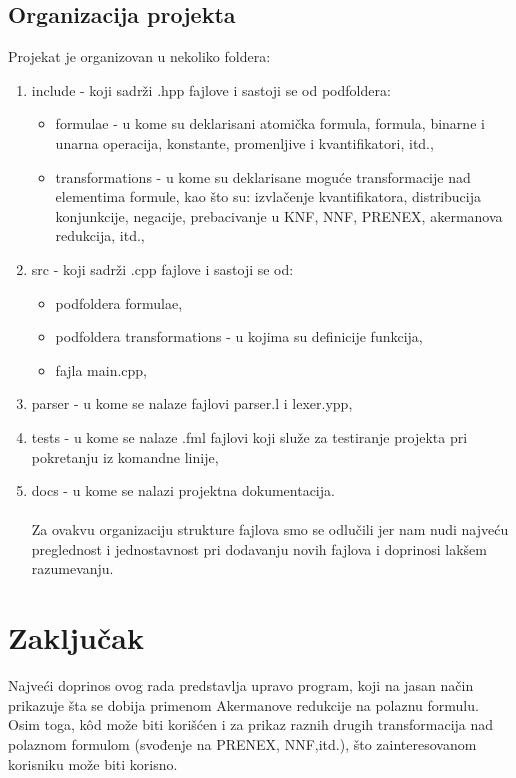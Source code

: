 \documentclass[a4paper]{article}
\begin{document}
\subsection{Organizacija projekta}
Projekat je organizovan u nekoliko foldera:
\begin{enumerate}
\item include - koji sadrži .hpp fajlove i sastoji se od podfoldera:
	\begin{itemize}
	\item formulae - u kome su deklarisani atomička formula, formula, binarne i unarna operacija, konstante, promenljive i kvantifikatori, itd.,
	\item transformations - u kome su deklarisane moguće transformacije nad elementima formule, kao što su: izvlačenje kvantifikatora, distribucija konjunkcije, negacije, prebacivanje u KNF, NNF, PRENEX, akermanova redukcija, itd.,
	\end{itemize}
\item src - koji sadrži .cpp fajlove i sastoji se od:
	\begin{itemize}
	\item podfoldera formulae,
	\item podfoldera transformations - u kojima su definicije funkcija,
	\item fajla main.cpp,
	\end{itemize}
\item parser - u kome se nalaze fajlovi parser.l i lexer.ypp,  
\item tests - u kome se nalaze .fml fajlovi koji služe za testiranje projekta pri pokretanju iz komandne linije,
\item docs - u kome se nalazi projektna dokumentacija.\\\\
Za ovakvu organizaciju strukture fajlova smo se odlučili jer nam nudi najveću preglednost i jednostavnost pri dodavanju novih fajlova i doprinosi lakšem razumevanju.
\end{enumerate}

\section{Zaključak}

Najveći doprinos ovog rada predstavlja upravo program, koji na jasan način prikazuje šta se dobija primenom Akermanove redukcije na polaznu formulu. Osim toga, k\^od može biti korišćen i za prikaz raznih drugih transformacija nad polaznom formulom (svođenje na PRENEX, NNF,itd.), što zainteresovanom korisniku može biti korisno.
\end{document}
